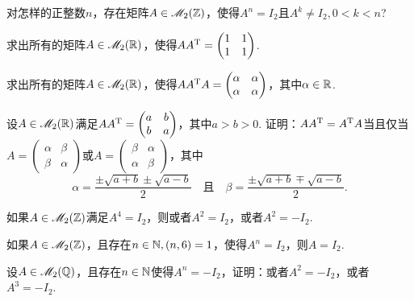 \begin{problem}
  \cite[p.140]{58} 对怎样的正整数$n$，存在矩阵$A\in\mathscr M_2(\mathbb Z)$，使得$A^n=I_2$且$A^k\ne I_2,0<k<n$?
\end{problem}

\begin{problem}
  求出所有的矩阵$A\in\mathscr M_2(\mathbb R)$，使得$AA^{\mathrm T}=\begin{pmatrix}
    1 & 1 \\
    1 & 1
  \end{pmatrix}$.
\end{problem}

\begin{problem}
  求出所有的矩阵$A\in\mathscr M_2(\mathbb R)$，使得$AA^{\mathrm T} A=\begin{pmatrix}
    \alpha & \alpha \\
    \alpha & \alpha
  \end{pmatrix}$，其中$\alpha\in\mathbb R$.
\end{problem}

\begin{problem}
  \cite{27} 设$A\in\mathscr M_2(\mathbb R)$满足$AA^{\mathrm T}=\begin{pmatrix}
    a & b \\
    b & a
  \end{pmatrix}$，其中$a>b>0$. 证明：$AA^{\mathrm T}=A^{\mathrm T} A$当且仅当$A=\begin{pmatrix}
    \alpha & \beta \\
    \beta & \alpha
  \end{pmatrix}$或$A=\begin{pmatrix}
    \beta & \alpha \\
    \alpha & \beta
  \end{pmatrix}$，其中
  \[
    \alpha = \frac{\pm\sqrt{a+b}\pm\sqrt{a-b}}2\quad
    \text{且} \quad
    \beta = \frac{\pm\sqrt{a+b}\mp\sqrt{a-b}}2.
  \]
\end{problem}

\begin{problem}
  如果$A\in\mathscr M_2(\mathbb Z)$满足$A^4=I_2$，则或者$A^2=I_2$，或者$A^2=-I_2$.
\end{problem}

\begin{problem}
  如果$A\in\mathscr M_2(\mathbb Z)$，且存在$n\in\mathbb N,(n,6)=1$，使得$A^n=I_2$，则$A=I_2$.
\end{problem}

\begin{mybox}
  \begin{problem}
    设$A\in\mathscr M_2(\mathbb Q)$，且存在$n\in\mathbb N$使得$A^n=-I_2$，证明：或者$A^2=-I_2$，或者$A^3=-I_2$.
  \end{problem}
\end{mybox}


